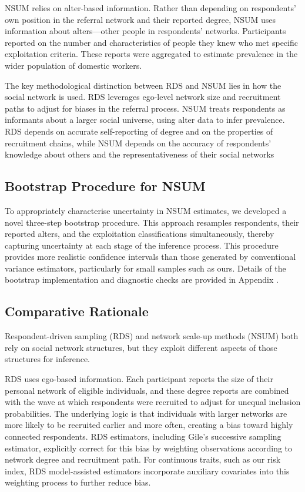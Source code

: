 \documentclass[
  12pt,
  letterpaper,
  DIV=11,
  numbers=noendperiod]{scrartcl}
\theoremstyle{plain}
\theoremstyle{definition}
\begin{document}
NSUM relies on alter-based information. Rather than depending on
respondents' own position in the referral network and their reported
degree, NSUM uses information about alters---other people in
respondents' networks. Participants reported on the number and
characteristics of people they knew who met specific exploitation
criteria. These reports were aggregated to estimate prevalence in the
wider population of domestic workers.

The key methodological distinction between RDS and NSUM lies in how the
social network is used. RDS leverages ego-level network size and
recruitment paths to adjust for biases in the referral process. NSUM
treats respondents as informants about a larger social universe, using
alter data to infer prevalence. RDS depends on accurate self-reporting
of degree and on the properties of recruitment chains, while NSUM
depends on the accuracy of respondents' knowledge about others and the
representativeness of their social networks

\subsection{Bootstrap Procedure for
NSUM}\label{bootstrap-procedure-for-nsum}

To appropriately characterise uncertainty in NSUM estimates, we
developed a novel three-step bootstrap procedure. This approach
resamples respondents, their reported alters, and the exploitation
classifications simultaneously, thereby capturing uncertainty at each
stage of the inference process. This procedure provides more realistic
confidence intervals than those generated by conventional variance
estimators, particularly for small samples such as ours. Details of the
bootstrap implementation and diagnostic checks are provided in Appendix
\textcite{app-3step}.

\subsection{Comparative Rationale}\label{comparative-rationale}

Respondent-driven sampling (RDS) and network scale-up methods (NSUM)
both rely on social network structures, but they exploit different
aspects of those structures for inference.

RDS uses ego-based information. Each participant reports the size of
their personal network of eligible individuals, and these degree reports
are combined with the wave at which respondents were recruited to adjust
for unequal inclusion probabilities. The underlying logic is that
individuals with larger networks are more likely to be recruited earlier
and more often, creating a bias toward highly connected respondents. RDS
estimators, including Gile's successive sampling estimator, explicitly
correct for this bias by weighting observations according to network
degree and recruitment path. For continuous traits, such as our risk
index, RDS model-assisted estimators incorporate auxiliary covariates
into this weighting process to further reduce bias.
\end{document}
